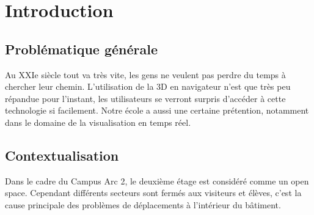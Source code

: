 \chapter{Introduction}

\section{Problématique générale}
Au XXIe siècle tout va très vite, les gens ne veulent pas perdre du temps à chercher leur chemin. L'utilisation de la 3D en navigateur n'est que très peu répandue pour l'instant, les utilisateurs se verront surpris d'accéder à cette technologie si facilement. Notre école a aussi une certaine prétention, notamment dans le domaine de la visualisation en temps réel.




\section{Contextualisation}
Dans le cadre du Campus Arc 2, le deuxième étage est considéré comme un open space. Cependant différents secteurs sont fermés aux visiteurs et élèves, c'est la cause principale des problèmes de déplacements à l'intérieur du bâtiment.